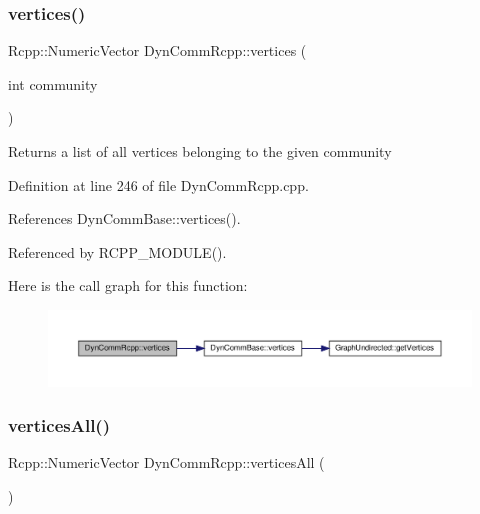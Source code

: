 \subsubsection{\texorpdfstring{vertices()}{vertices()}}
{\footnotesize\ttfamily Rcpp\+::\+Numeric\+Vector Dyn\+Comm\+Rcpp\+::vertices (\begin{DoxyParamCaption}\item[{int}]{community }\end{DoxyParamCaption})\hspace{0.3cm}{\ttfamily [inline]}}

\begin{DoxyReturn}{Returns}
a list of all vertices belonging to the given community 
\end{DoxyReturn}


Definition at line 246 of file Dyn\+Comm\+Rcpp.\+cpp.



References Dyn\+Comm\+Base\+::vertices().



Referenced by R\+C\+P\+P\+\_\+\+M\+O\+D\+U\+L\+E().

Here is the call graph for this function\+:
\nopagebreak
\begin{figure}[H]
\begin{center}
\leavevmode
\includegraphics[width=350pt]{classDynCommRcpp_ad849d8e27c9f8aec2f6cdf89b06b9be4_cgraph}
\end{center}
\end{figure}
\mbox{\label{classDynCommRcpp_aa2aa3fe8c7af4239bd9b3c6a669329ec}} 
\subsubsection{\texorpdfstring{vertices\+All()}{verticesAll()}}
{\footnotesize\ttfamily Rcpp\+::\+Numeric\+Vector Dyn\+Comm\+Rcpp\+::vertices\+All (\begin{DoxyParamCaption}{ }\end{DoxyParamCaption})\hspace{0.3cm}{\ttfamily [inline]}}




